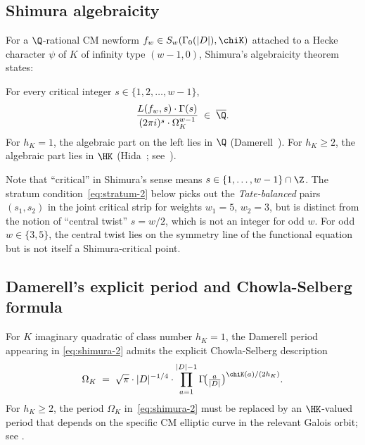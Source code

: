 \subsection{Shimura algebraicity}\label{ss:shimura}

For a $\Q$-rational CM newform $f_w \in S_w(\Gamma_0(|D|), \chiK)$
attached to a Hecke character $\psi$ of $K$ of infinity type
$(w-1, 0)$, Shimura's algebraicity
theorem~\cite{Shimura1976} states:

\begin{theorem}[Shimura 1976]\label{thm:shimura}
For every critical integer $s \in \{1, 2, \dots, w-1\}$,
\begin{equation}\label{eq:shimura-2}
\frac{L(f_w, s) \cdot \Gamma(s)}{(2\pi i)^s \cdot \Omega_K^{w-1}}
\;\in\; \overline{\Q}.
\end{equation}
For $h_K = 1$, the algebraic part on the left lies in $\Q$
(Damerell~\cite{Damerell1971}). For $h_K \geq 2$, the algebraic
part lies in $\HK$
(Hida~\cite{Hida1981}; see~).
\end{theorem}

\begin{remark}\label{rem:central-vs-critical}
Note that ``critical'' in Shimura's sense means $s \in
\{1, \dots, w-1\} \cap \Z$. The stratum
condition~\eqref{eq:stratum-2} below picks out the
\emph{Tate-balanced} pairs $(s_1, s_2)$ in the joint critical
strip for weights $w_1 = 5$, $w_2 = 3$, but is distinct from the
notion of ``central twist'' $s = w/2$, which is not an integer
for odd $w$. For odd $w \in \{3, 5\}$, the central twist lies on
the symmetry line of the functional equation but is not itself a
Shimura-critical point.
\end{remark}

\subsection{Damerell's explicit period and Chowla-Selberg formula}
\label{ss:damerell}

For $K$ imaginary quadratic of class number $h_K = 1$, the
Damerell period~\cite{Damerell1971} appearing in
\eqref{eq:shimura-2} admits the explicit Chowla-Selberg
description~\cite{ChowlaSelberg1949}
\begin{equation}\label{eq:chowla-selberg-2}
\Omega_K \;=\; \sqrt{\pi} \cdot |D|^{-1/4} \cdot
\prod_{a=1}^{|D|-1} \Gamma\!\bigl(\tfrac{a}{|D|}\bigr)^{\chiK(a)/(2h_K)}.
\end{equation}
For $h_K \geq 2$, the period $\Omega_K$ in~\eqref{eq:shimura-2}
must be replaced by an $\HK$-valued period that depends on the
specific CM elliptic curve in the relevant Galois orbit; see
\cite[\S 8]{Hida1981}.


